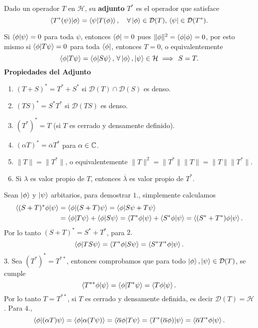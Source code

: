 \documentclass[main.tex]{subfiles}
\begin{document}
\begin{def.}
Dado un operador $T$ en $\mathcal{H}$, su \textbf{adjunto} $T^*$ es el operador que satisface
\[
\braket{T^{*}(\psi)|\phi}=\braket{\psi| T(\phi)}, \quad \forall \ket{\phi} \in \mathcal{D}(T), \, \bra{\psi} \in \mathcal{D}(T^*).
\]
\end{def.}
\obs Si $\braket{\phi|\psi}=0$ para toda $\psi$, entonces $\bra{\phi}=0$ pues $\|\phi\|^{2}=\braket{\phi|\phi}=0$, por esto mismo si $\braket{\phi|T\psi}=0$ para toda $\bra{\phi}$, entonces $T=0$, o equivalentemente
\[
  \braket{\phi|T\psi}=\braket{\phi|S\psi},\,\forall\ket{\phi},\ket{\psi}\in\mathcal{H}\implies\,S=T.
\]
\noindent\textbf{Propiedades del Adjunto}
\begin{enumerate}
  \item $(T + S)^* = T^* + S^*$ si $\mathcal{D}(T) \cap \mathcal{D}(S)$ es denso.
  \item $(TS)^* = S^* T^*$ si $\mathcal{D}(TS)$ es denso.
  \item $(T^*)^* = T$ (si $T$ es cerrado y densamente definido).
  \item $(\alpha T)^* = \overline{\alpha} T^*$ para $\alpha \in \mathbb C $.
  \item $\|T\|=\|T^{*}\|$, o equivalentemente $\|T\|^{2}=\|T^{*}\|\|T\|=\|T\|\|T^{*}\|$.
  \item Si $\lambda$ es valor propio de $T$, entonces $\overline{\lambda}$ es valor propio de $T^{*}$.
\end{enumerate}
\dem Sean $\ket{\phi}$ y $\ket{\psi}$ arbitarios, para demostrar $1.$, simplemente calculamos
\begin{align*}
  \braket{(S+T)^{*}\phi|\psi}&=\braket{\phi|(S+T)\psi}=\braket{\phi|S\psi+T\psi}\\
  &=\braket{\phi|T\psi}+\braket{\phi|S\psi}=\braket{T^{*}\phi|\psi}+\braket{S^{*}\phi|\psi}=\braket{(S^{*}+T^{*})\phi|\psi}.
\end{align*}
Por lo tanto $(S+T)^{*}=S^{*}+T^{*}$, para $2.$
\[
  \braket{\phi|TS\psi}=\braket{T^{*}\phi|S\psi}=\braket{S^{*}T^{*}\phi|\psi}.
\]
$3.$ Sea $(T^{*})^{*}=T^{**}$, entonces comprobamos que para todo $\ket{\phi},\ket{\psi}\in\mathcal{D}(T)$, se cumple
\[
  \braket{T^{**}\phi|\psi}=\braket{\phi|T^{*}\psi}=\braket{T\phi|\psi}.
  \]
Por lo tanto $T=T^{**}$, si $T$ es cerrado y densamente definida, es decir $\mathcal{D}(T)=\mathcal{H}$. Para $4.$,
\[
  \braket{\phi|(\alpha T)\psi}=\braket{\phi|\alpha(T\psi)}=\braket{\overline{\alpha}\phi|T\psi}=\braket{T^{*}(\overline{\alpha}\phi)|\psi}=\braket{\overline{\alpha}T^{*}\phi|\psi}.
\]
\end{document}
